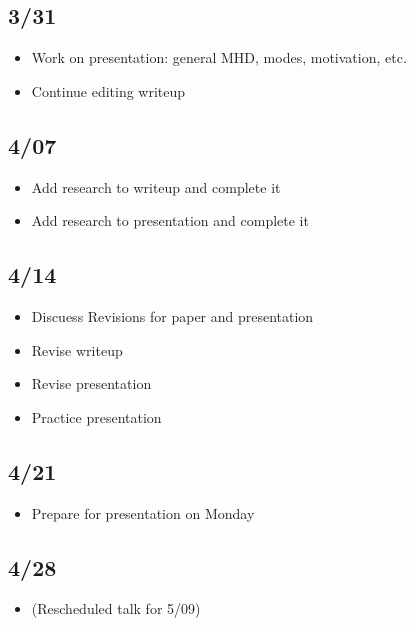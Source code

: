 \documentclass[12pt]{article}
\begin{document}
\subsection*{3/31}
\begin{itemize}
    \item Work on presentation: general MHD, modes, motivation, etc.
    \item Continue editing writeup
\end{itemize}

\subsection*{4/07}
\begin{itemize}
    \item Add research to writeup and complete it
    \item Add research to presentation and complete it
\end{itemize}

\subsection*{4/14}
\begin{itemize}
    \item Discuess Revisions for paper and presentation
    \item Revise writeup
    \item Revise presentation
    \item Practice presentation
\end{itemize}
\subsection*{4/21}
\begin{itemize}
    \item Prepare for presentation on Monday
\end{itemize}
\subsection*{4/28}
\begin{itemize}
    \item (Rescheduled talk for 5/09)
\end{itemize}
\end{document}
